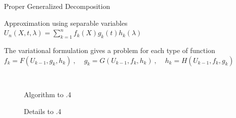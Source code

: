 \documentclass[12pt]{beamer}
\newcommand\FontPOD{\fontsize{10}{12}\selectfont}
\begin{document}
\begin{frame}{Proper Generalized Decomposition}
	\FontPOD
	\begin{exampleblock}{Approximation using separable variables}
	$ \displaystyle U_n(X,t,\lambda) = \sum_{k=1}^n 
											f_k(X) g_k(t) h_k(\lambda)$
	\end{exampleblock}
	\vspace{-0.1cm}
	\begin{exampleblock}{The variational formulation gives a problem for each type of function}
	$ f_k = F (U_{k-1},g_k,h_k)~,~~~~~
	 g_k = G (U_{k-1},f_k,h_k)~,~~~~~
	 h_k = H (U_{k-1},f_k,g_k)$
	\end{exampleblock}
	\vspace{-0.4cm}
	\begin{figure}[t]
	$~$
	   \begin{minipage}[l]{0.40\linewidth}
			\begin{exampleblock}{Algorithm}
			\vbox to .4
			\end{exampleblock}
	   \end{minipage}\hspace{0.05cm}
	   \begin{minipage}{0.52\linewidth}
			\begin{exampleblock}{Details \phantom{g}}
			\vbox to .4\textheight{%
				\[
				\begin{array}{l}
				~\text{Iterating on the modes }\\
				~ \phantom{for}\text{Using a fixed point loop}\\
				\phantom{for for}
				~\left\{
				\begin{array}{l l}
				&\!\!\!\!\!\!\!\!f_k = F (U_{k-1},g_k,h_k) \\
				&\!\!\!\!\!\!\!\!g_k = G (U_{k-1},f_k,h_k) \\
				&\!\!\!\!\!\!\!\!h_k = H (U_{k-1},f_k,g_k) \\				
				\end{array}
				\right.			\\
				~ \phantom{for}\text{to solve the non-linear problem.} \\
				~\text{until you reach }n\text{ modes.}\\			
				\end{array}
				\]
			}
			\end{exampleblock}
	   \end{minipage}
	\end{figure}
	
\end{frame}
\end{document}
